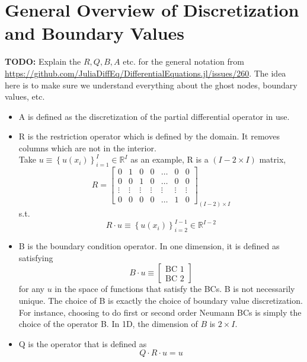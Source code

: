 \documentclass[11pt]{article}
\newcommand{\set}[1]{\ensuremath{\left\{{#1}\right\}}}
\newcommand{\R}{\ensuremath{\mathbb{R}}}
\begin{document}
\section{General Overview of Discretization and Boundary Values}\label{sec:general}
\textbf{TODO:} Explain the $R, Q, B, A$ etc. for the general notation from \url{https://github.com/JuliaDiffEq/DifferentialEquations.jl/issues/260}.  The idea here is to make sure we understand everything about the ghost nodes, boundary values, etc.
\begin{itemize}
\item A is defined as the discretization of the partial differential operator in use.
\item R is the restriction operator which is defined by the domain. It removes columns which are not in the interior.\\
Take $u \equiv \set{u(x_i)}_{i=1}^I \in \R^I$ as an example, R is a $(I-2\times I)$ matrix,
\begin{equation}
R = \begin{bmatrix}
0&1&0&0&\dots &0&0\\
0&0&1&0&\dots &0&0\\
\vdots&\vdots&\vdots&\vdots&\vdots&\vdots&\vdots\\
0&0&0&0&\dots&1&0
\end{bmatrix}_{(I-2)\times I}
\end{equation}
s.t. 
\begin{equation}
R\cdot u  \equiv\set{u(x_i)}_{i=2}^{I-1} \in \R^{I-2} \label{R_operator}
\end{equation}
\item B is the boundary condition operator. In one dimension, it is defined as satisfying
\begin{equation}
B\cdot u \equiv \begin{bmatrix}
\text{BC 1}\\
\text{BC 2}
\end{bmatrix}\label{B_operator}
\end{equation}
for any $u$ in the space of functions that satisfy the BCs. B is not necessarily unique. The choice of B is exactly the choice of boundary value discretization. For instance, choosing to do first or second order Neumann BCs is simply the choice of the operator B. In 1D, the dimension of $B$ is $2\times I$.
\item Q is the operator that is defined as
\begin{equation}
Q \cdot R\cdot u = u\label{Q_operator_1}
\end{equation}

\end{itemize}
\end{document}
